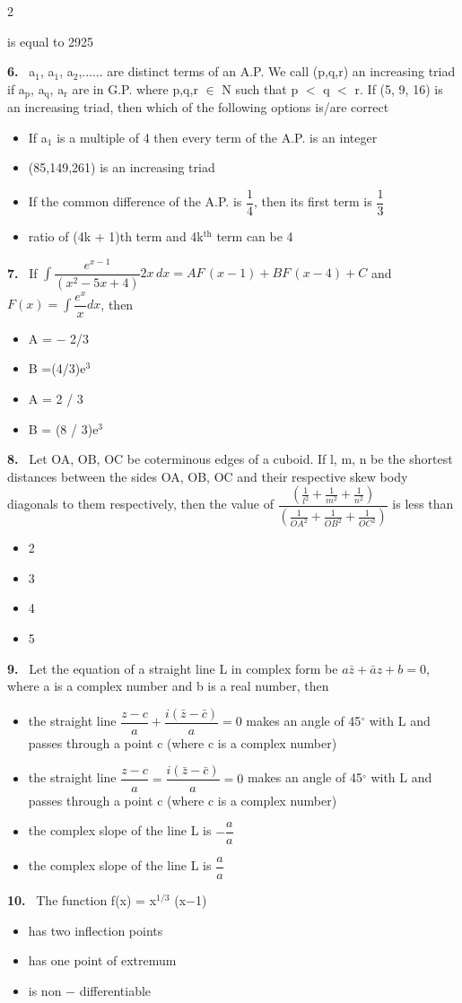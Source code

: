 \documentclass[10pt]{extarticle}
\newcommand{\qn}[1]{\par\smallskip\noindent\textbf{#1.}~}
\newenvironment{qoptions}{\begin{itemize}[leftmargin=1.8em,itemsep=1pt,topsep=2pt,label={}]}{\end{itemize}}
\newcommand{\opt}[2]{\item[(#1)] #2}
\begin{document}
\begin{multicols}{2}
\begin{qoptions}
{ is equal to 2925}
\end{qoptions}
\qn{6} a$_1$, a$_1$, a$_2$,...... are distinct terms of an A.P. We call (p,q,r) an increasing triad if a$_\mathrm p$, a$_\mathrm q$, a$_\mathrm r$ are in G.P. where p,q,r $\in$ N such that p $<$ q $<$ r. If (5, 9, 16) is an increasing triad, then which of the following options is/are correct
\begin{qoptions}
\opt{A}{If a$_1$ is a multiple of 4 then every term of the A.P. is an integer}
\opt{B}{(85,149,261) is an increasing triad}
\opt{C}{If the common difference of the A.P. is $\dfrac14$, then its first term is $\dfrac13$}
\opt{D}{ratio of (4k + 1)th term and 4k$^\mathrm{th}$ term can be 4}
\end{qoptions}
\qn{7} If $\displaystyle\int\dfrac{e^{x-1}}{\left(x^2-5x+4\right)}2x\,dx=AF\,(x-1)+BF\,(x-4)+C$ and $F(x)=\displaystyle\int\dfrac{e^x}{x}dx$, then
\begin{qoptions}
\opt{A}{A = $-$ 2/3}
\opt{B}{B =(4/3)e$^3$}
\opt{C}{A = 2 / 3}
\opt{D}{B = (8 / 3)e$^3$}
\end{qoptions}
\qn{8} Let OA, OB, OC be coterminous edges of a cuboid. If l, m, n be the shortest distances between the sides OA, OB, OC and their respective skew body diagonals to them respectively, then the value of $\dfrac{\left(\frac1{l^2}+\frac1{m^2}+\frac1{n^2}\right)}{\left(\frac1{OA^2}+\frac1{OB^2}+\frac1{OC^2}\right)}$ is less than
\begin{qoptions}
\opt{A}{2}
\opt{B}{3}
\opt{C}{4}
\opt{D}{5}
\end{qoptions}
\qn{9} Let the equation of a straight line L in complex form be $a\bar z+\bar az+b=0$, where a is a complex number and b is a real number, then
\begin{qoptions}
\opt{A}{the straight line $\dfrac{z-c}a+\dfrac{i(\bar z-\bar c)}a=0$ makes an angle of 45$^\circ$ with L and passes through a point c (where c is a complex number)}
\opt{B}{the straight line $\dfrac{z-c}a=\dfrac{i(\bar z-\bar c)}a=0$ makes an angle of 45$^\circ$ with L and passes through a point c (where c is a complex number)}
\opt{C}{the complex slope of the line L is $-\dfrac aa$}
\opt{D}{the complex slope of the line L is $\dfrac aa$}
\end{qoptions}
\qn{10} The function f(x) = x$^{1/3}$ (x$-$1)
\begin{qoptions}
\opt{A}{has two inflection points}
\opt{B}{has one point of extremum}
\opt{C}{is non $-$ differentiable}

\end{qoptions}
\end{multicols}
\end{document}
